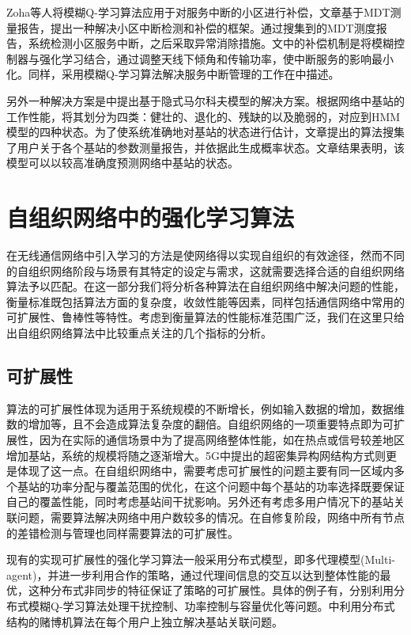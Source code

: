 ﻿\documentclass[11pt,draftclsnofoot,onecolumn,journal,letterpaper]{IEEEtran}
\begin{document}
Zoha等人\cite{Zoha2016}将模糊Q-学习算法应用于对服务中断的小区进行补偿，文章基于MDT测量报告，提出一种解决小区中断检测和补偿的框架。通过搜集到的MDT测度报告，系统检测小区服务中断，之后采取异常消除措施。文中的补偿机制是将模糊控制器与强化学习结合，通过调整天线下倾角和传输功率，使中断服务的影响最小化。同样，采用模糊Q-学习算法解决服务中断管理的工作在\cite{Razavi2010}\cite{Razavi2010a}\cite{Islam2012}中描述。

另外一种解决方案是\cite{Alias2016}中提出基于隐式马尔科夫模型的解决方案。根据网络中基站的工作性能，将其划分为四类：健壮的、退化的、残缺的以及脆弱的，对应到HMM模型的四种状态。为了使系统准确地对基站的状态进行估计，文章提出的算法搜集了用户关于各个基站的参数测量报告，并依据此生成概率状态。文章结果表明，该模型可以以较高准确度预测网络中基站的状态。

\section{自组织网络中的强化学习算法}
\label{sec:Compare}
在无线通信网络中引入学习的方法是使网络得以实现自组织的有效途径，然而不同的自组织网络阶段与场景有其特定的设定与需求，这就需要选择合适的自组织网络算法予以匹配。在这一部分我们将分析各种算法在自组织网络中解决问题的性能，衡量标准既包括算法方面的复杂度，收敛性能等因素，同样包括通信网络中常用的可扩展性、鲁棒性等特性。考虑到衡量算法的性能标准范围广泛，我们在这里只给出自组织网络算法中比较重点关注的几个指标的分析。
\subsection{可扩展性}
算法的可扩展性体现为适用于系统规模的不断增长，例如输入数据的增加，数据维数的增加等，且不会造成算法复杂度的翻倍。自组织网络的一项重要特点即为可扩展性，因为在实际的通信场景中为了提高网络整体性能，如在热点或信号较差地区增加基站，系统的规模将随之逐渐增大。5G中提出的超密集异构网结构方式则更是体现了这一点。在自组织网络中，需要考虑可扩展性的问题主要有同一区域内多个基站的功率分配与覆盖范围的优化，在这个问题中每个基站的功率选择既要保证自己的覆盖性能，同时考虑基站间干扰影响。另外还有考虑多用户情况下的基站关联问题，需要算法解决网络中用户数较多的情况。在自修复阶段，网络中所有节点的差错检测与管理也同样需要算法的可扩展性。

现有的实现可扩展性的强化学习算法一般采用分布式模型，即多代理模型(Multi-agent)，并进一步利用合作的策略，通过代理间信息的交互以达到整体性能的最优，这种分布式非同步的特征保证了策略的可扩展性。具体的例子有\cite{Dirani2010}\cite{Fan2014}\cite{Islam2012}，分别利用分布式模糊Q-学习算法处理干扰控制、功率控制与容量优化等问题。\cite{Maghsudi2017}中利用分布式结构的赌博机算法在每个用户上独立解决基站关联问题。
\end{document}
